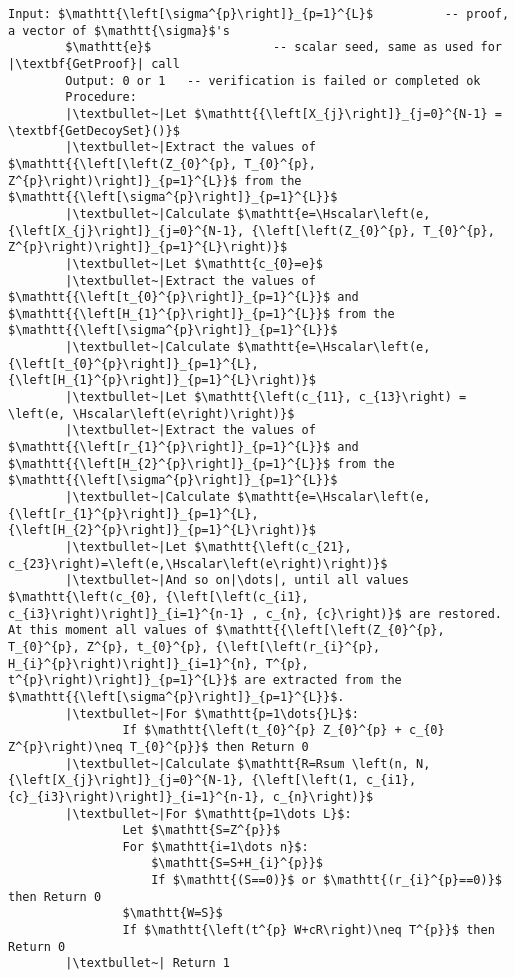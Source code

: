 \documentclass{mathcryptology} %
\newcommand{\Hscalar}{\textbf{H}_{\textbf{scalar}}}
\theoremstyle{title}
\theoremstyle{titleof}
\begin{document}
\begin{itemize}
        \begin{mdframed}[backgroundcolor=black!10!white]
        \begin{lstlisting}[caption={\textbf{mL2SHPoM.Verif} specification.},label={Lis:5}]
        Input: $\mathtt{\left[\sigma^{p}\right]}_{p=1}^{L}$          -- proof, a vector of $\mathtt{\sigma}$'s
        $\mathtt{e}$                 -- scalar seed, same as used for |\textbf{GetProof}| call
        Output: 0 or 1   -- verification is failed or completed ok
        Procedure:
        |\textbullet~|Let $\mathtt{{\left[X_{j}\right]}_{j=0}^{N-1} = \textbf{GetDecoySet}()}$
        |\textbullet~|Extract the values of $\mathtt{{\left[\left(Z_{0}^{p}, T_{0}^{p}, Z^{p}\right)\right]}_{p=1}^{L}}$ from the $\mathtt{{\left[\sigma^{p}\right]}_{p=1}^{L}}$
        |\textbullet~|Calculate $\mathtt{e=\Hscalar\left(e, {\left[X_{j}\right]}_{j=0}^{N-1}, {\left[\left(Z_{0}^{p}, T_{0}^{p}, Z^{p}\right)\right]}_{p=1}^{L}\right)}$
        |\textbullet~|Let $\mathtt{c_{0}=e}$
        |\textbullet~|Extract the values of $\mathtt{{\left[t_{0}^{p}\right]}_{p=1}^{L}}$ and $\mathtt{{\left[H_{1}^{p}\right]}_{p=1}^{L}}$ from the $\mathtt{{\left[\sigma^{p}\right]}_{p=1}^{L}}$
        |\textbullet~|Calculate $\mathtt{e=\Hscalar\left(e, {\left[t_{0}^{p}\right]}_{p=1}^{L}, {\left[H_{1}^{p}\right]}_{p=1}^{L}\right)}$
        |\textbullet~|Let $\mathtt{\left(c_{11}, c_{13}\right) = \left(e, \Hscalar\left(e\right)\right)}$
        |\textbullet~|Extract the values of $\mathtt{{\left[r_{1}^{p}\right]}_{p=1}^{L}}$ and $\mathtt{{\left[H_{2}^{p}\right]}_{p=1}^{L}}$ from the $\mathtt{{\left[\sigma^{p}\right]}_{p=1}^{L}}$
        |\textbullet~|Calculate $\mathtt{e=\Hscalar\left(e,{\left[r_{1}^{p}\right]}_{p=1}^{L}, {\left[H_{2}^{p}\right]}_{p=1}^{L}\right)}$
        |\textbullet~|Let $\mathtt{\left(c_{21}, c_{23}\right)=\left(e,\Hscalar\left(e\right)\right)}$
        |\textbullet~|And so on|\dots|, until all values $\mathtt{\left(c_{0}, {\left[\left(c_{i1}, c_{i3}\right)\right]}_{i=1}^{n-1} , c_{n}, {c}\right)}$ are restored. At this moment all values of $\mathtt{{\left[\left(Z_{0}^{p}, T_{0}^{p}, Z^{p}, t_{0}^{p}, {\left[\left(r_{i}^{p}, H_{i}^{p}\right)\right]}_{i=1}^{n}, T^{p}, t^{p}\right)\right]}_{p=1}^{L}}$ are extracted from the $\mathtt{{\left[\sigma^{p}\right]}_{p=1}^{L}}$.
        |\textbullet~|For $\mathtt{p=1\dots{}L}$:
                If $\mathtt{\left(t_{0}^{p} Z_{0}^{p} + c_{0} Z^{p}\right)\neq T_{0}^{p}}$ then Return 0
        |\textbullet~|Calculate $\mathtt{R=Rsum \left(n, N, {\left[X_{j}\right]}_{j=0}^{N-1}, {\left[\left(1, c_{i1}, {c}_{i3}\right)\right]}_{i=1}^{n-1}, c_{n}\right)}$
        |\textbullet~|For $\mathtt{p=1\dots L}$:
                Let $\mathtt{S=Z^{p}}$
                For $\mathtt{i=1\dots n}$:
                    $\mathtt{S=S+H_{i}^{p}}$
                    If $\mathtt{(S==0)}$ or $\mathtt{(r_{i}^{p}==0)}$ then Return 0
                $\mathtt{W=S}$
                If $\mathtt{\left(t^{p} W+cR\right)\neq T^{p}}$ then Return 0
        |\textbullet~| Return 1
        \end{lstlisting}
        \end{mdframed}
    \end{itemize}
\end{document}
